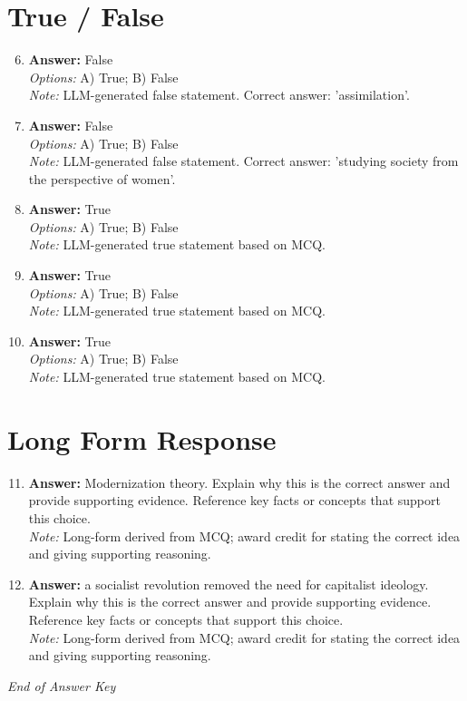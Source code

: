 \documentclass[12pt]{article}
\begin{document}
\section*{True / False}
\begin{enumerate}[label=\arabic*.]
\setcounter{enumi}{5}
\item \textbf{Answer:} False
\\ \textit{Options:} A) True; B) False
\\ \textit{Note:} LLM-generated false statement. Correct answer: 'assimilation'.
\item \textbf{Answer:} False
\\ \textit{Options:} A) True; B) False
\\ \textit{Note:} LLM-generated false statement. Correct answer: 'studying society from the perspective of women'.
\item \textbf{Answer:} True
\\ \textit{Options:} A) True; B) False
\\ \textit{Note:} LLM-generated true statement based on MCQ.
\item \textbf{Answer:} True
\\ \textit{Options:} A) True; B) False
\\ \textit{Note:} LLM-generated true statement based on MCQ.
\item \textbf{Answer:} True
\\ \textit{Options:} A) True; B) False
\\ \textit{Note:} LLM-generated true statement based on MCQ.
\end{enumerate}

\section*{Long Form Response}
\begin{enumerate}[label=\arabic*.]
\setcounter{enumi}{10}
\item \textbf{Answer:} Modernization theory. Explain why this is the correct answer and provide supporting evidence. Reference key facts or concepts that support this choice.
\\ \textit{Note:} Long-form derived from MCQ; award credit for stating the correct idea and giving supporting reasoning.
\item \textbf{Answer:} a socialist revolution removed the need for capitalist ideology. Explain why this is the correct answer and provide supporting evidence. Reference key facts or concepts that support this choice.
\\ \textit{Note:} Long-form derived from MCQ; award credit for stating the correct idea and giving supporting reasoning.
\end{enumerate}

\vfill
\noindent\textit{End of Answer Key}
\end{document}
